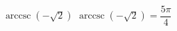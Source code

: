  {$\operatorname{arccsc} \left( -\sqrt{2} \right)$ }
{ $\operatorname{arccsc} \left( -\sqrt{2} \right) = \dfrac{5\pi}{4}$ }
